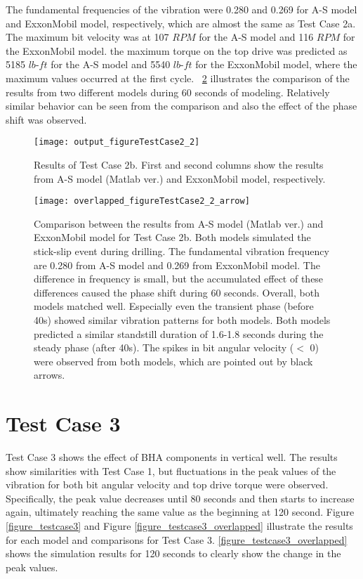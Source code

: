The fundamental frequencies of the vibration were 0.280 and 0.269 for A-S model and ExxonMobil model, respectively, which are almost the same as Test Case 2a. The maximum bit velocity was at 107 $RPM$ for the A-S model and 116 $RPM$ for the ExxonMobil model. the maximum torque on the top drive was predicted as 5185 $lb\mbox{-}ft$ for the A-S model and 5540 $lb\mbox{-}ft$ for the ExxonMobil model, where the maximum values occurred at the first cycle. \figurename~\ref{figure_testcase2_2_overlapped} illustrates the comparison of the results from two different models during 60 seconds of modeling. Relatively similar behavior can be seen from the comparison and also the effect of the phase shift was observed.

\begin{figure}
  \centering
  \texttt{[image: output\_figureTestCase2\_2]}
  \caption[Results of Test Case 2b]{Results of Test Case 2b. First and second columns show the results from A-S model (Matlab ver.) and ExxonMobil model, respectively.}\label{figure_testcase2_2}
\end{figure}

\begin{figure}
  \centering
  \texttt{[image: overlapped\_figureTestCase2\_2\_arrow]}
  \caption[Comparison of the results for Test Case 2b]{Comparison between the results from A-S model (Matlab ver.) and ExxonMobil model for Test Case 2b. Both models simulated the stick-slip event during drilling. The fundamental vibration frequency are 0.280 from A-S model and 0.269 from ExxonMobil model. The difference in frequency is small, but the accumulated effect of these differences caused the phase shift during 60 seconds. Overall, both models matched well. Especially even the transient phase (before 40s) showed similar vibration patterns for both models. Both models predicted a similar standstill duration of 1.6-1.8 seconds during the steady phase (after 40s). The spikes in bit angular velocity ($<$ 0) were observed from both models, which are pointed out by black arrows.}\label{figure_testcase2_2_overlapped}
\end{figure}

\section{Test Case 3}
Test Case 3 shows the effect of BHA components in vertical well. The results show similarities with Test Case 1, but fluctuations in the peak values of the vibration for both bit angular velocity and top drive torque were observed. Specifically, the peak value decreases until 80 seconds and then starts to increase again, ultimately reaching the same value as the beginning at 120 second. Figure \ref{figure_testcase3} and Figure \ref{figure_testcase3_overlapped} illustrate the results for each model and comparisons for Test Case 3. \ref{figure_testcase3_overlapped} shows the simulation results for 120 seconds to clearly show the change in the peak values.


